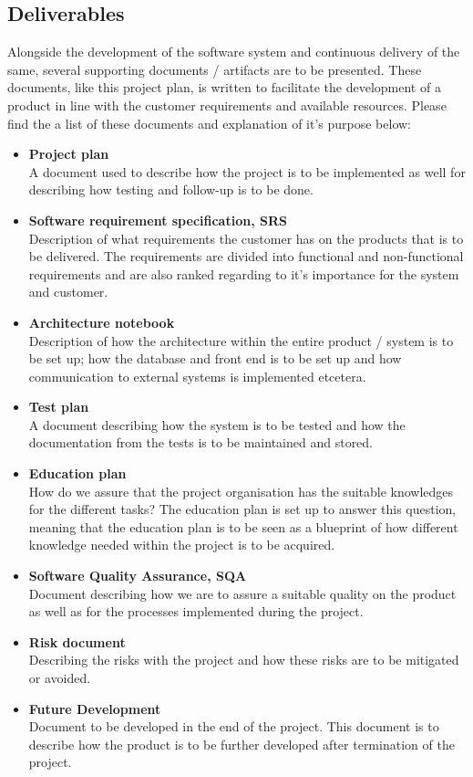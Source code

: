 \subsection{Deliverables}
Alongside the development of the software system and continuous delivery of the same, several supporting documents / artifacts are to be presented. These documents, like this project plan, is written to facilitate the development of a product in line with the customer requirements and available resources. Please find the a list of these documents and explanation of it's purpose below:
\begin{itemize}
    \item{\textbf{Project plan}} \\
    A document used to describe how the project is to be implemented as well for describing how testing and follow-up is to be done. 
    \item{\textbf{Software requirement specification, SRS}} \\
    Description of what requirements the customer has on the products that is to be delivered. The requirements are divided into functional and non-functional requirements and are also ranked regarding to it's importance for the system and customer. 
    \item{\textbf{Architecture notebook}} \\
    Description of how the architecture within the entire product / system is to be set up; how the database and front end is to be set up and how communication to external systems is implemented etcetera.  
    \item{\textbf{Test plan}} \\
    A document describing how the system is to be tested and how the documentation from the tests is to be maintained and stored. 
    \item{\textbf{Education plan}} \\
    How do we assure that the project organisation has the suitable knowledges for the different tasks? The education plan is set up to answer this question, meaning that the education plan is to be seen as a blueprint of how different knowledge needed within the project is to be acquired. 
    \item{\textbf{Software Quality Assurance, SQA}} \\
    Document describing how we are to assure a suitable quality on the product as well as for the processes implemented during the project. 
    \item{\textbf{Risk document}} \\
    Describing the risks with the project and how these risks are to be mitigated or avoided.
    \item{\textbf{Future Development}} \\
    Document to be developed in the end of the project. This document is to describe how the product is to be further developed after termination of the project. 
\end{itemize}
